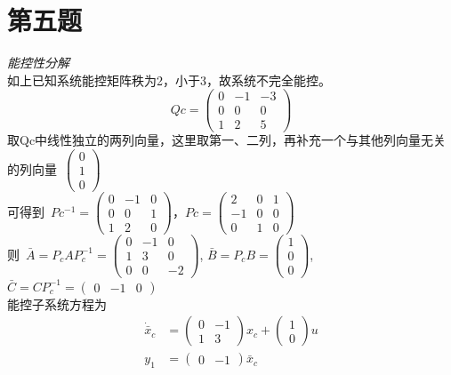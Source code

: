 \documentclass[a4paper]{article}
\begin{document}
\section*{第五题}
\emph{能控性分解}\\
如上已知系统能控矩阵秩为2，小于3，故系统不完全能控。\\
$$Qc= \left(\begin{array}{ccc} 0 & -1 & -3\\ 0 & 0 & 0\\ 1 & 2 & 5 \end{array}\right) $$
\mbox{取Qc中线性独立的两列向量，这里取第一、二列，再补充一个与其他列向量无关的列向量 }$\left(\begin{array}{c} 0\\ 1\\ 0 \end{array}\right)$ \\
\mbox{可得到 }$Pc^{-1}=\left(\begin{array}{ccc} 0 & -1 & 0\\ 0 & 0 & 1\\ 1 & 2 & 0 \end{array}\right)$，$Pc=\left(\begin{array}{ccc} 2 & 0 & 1\\ -1 & 0 & 0\\ 0 & 1 & 0 \end{array}\right)$ \\
\mbox{则 }$ \bar{A} =P_{c}AP_{c}^{-1}= \left(\begin{array}{ccc} 0 & -1 & 0\\ 1 & 3 & 0\\ 0 & 0 & -2 \end{array}\right)$,
$ \bar{B} =P_{c}B=\left(\begin{array}{c} 1\\ 0\\ 0 \end{array}\right)$,
$ \bar{C} =CP_{c}^{-1}=\left(\begin{array}{ccc} 0 & -1 & 0 \end{array}\right)$
\noindent \\
能控子系统方程为
\begin{align*}
\dot{\bar{x}}_{c} &=  \left(\begin{array}{cc} 0 & -1\\ 1 & 3 \end{array}\right)x_{c}+\left(\begin{array}{c} 1\\ 0 \end{array}\right)u \\ 
y_{1} &= \left(\begin{array}{cc} 0 & -1 \end{array}\right)\bar{x}_{c}
\end{align*}
\end{document}
